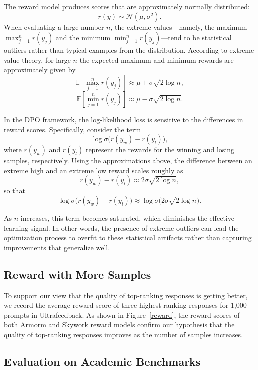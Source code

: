 The reward model produces scores that are approximately normally distributed:
\[
r(y) \sim \mathcal{N}(\mu, \sigma^2).
\]
When evaluating a large number \( n \), the extreme values—namely, the maximum \( \max_{j=1}^{n} r(y_j) \) and the minimum \( \min_{j=1}^{n} r(y_j) \)—tend to be statistical outliers rather than typical examples from the distribution. According to extreme value theory, for large \( n \) the expected maximum and minimum rewards are approximately given by
\[
\mathbb{E}\left[ \max_{j=1}^{n} r(y_j) \right] \approx \mu + \sigma \sqrt{2 \log n},
\]
\[
\mathbb{E}\left[ \min_{j=1}^{n} r(y_j) \right] \approx \mu - \sigma \sqrt{2 \log n}.
\]

In the DPO framework, the log-likelihood loss is sensitive to the differences in reward scores. Specifically, consider the term
\[
\log \sigma \bigl(r(y_w) - r(y_l)\bigr),
\]
where \( r(y_w) \) and \( r(y_l) \) represent the rewards for the winning and losing samples, respectively. Using the approximations above, the difference between an extreme high and an extreme low reward scales roughly as
\[
r(y_w) - r(y_l) \approx 2\sigma \sqrt{2 \log n},
\]
so that
\[
\log \sigma \bigl(r(y_w) - r(y_l)\bigr) \approx \log \sigma \bigl(2\sigma \sqrt{2 \log n}\bigr).
\]

As \( n \) increases, this term becomes saturated, which diminishes the effective learning signal. In other words, the presence of extreme outliers can lead the optimization process to overfit to these statistical artifacts rather than capturing improvements that generalize well.


\subsection{Reward with More Samples}
\label{appendix_reward}


To support our view that the quality of top-ranking responses is getting better, we record the average reward score of three highest-ranking responses for 1,000 prompts in Ultrafeedback. 
As shown in Figure~\ref{reward}, the reward scores of both Armorm and Skywork reward models confirm our hypothesis that the quality of top-ranking responses improves as the number of samples increases.

\subsection{Evaluation on Academic Benchmarks}
\label{aca_bm}



